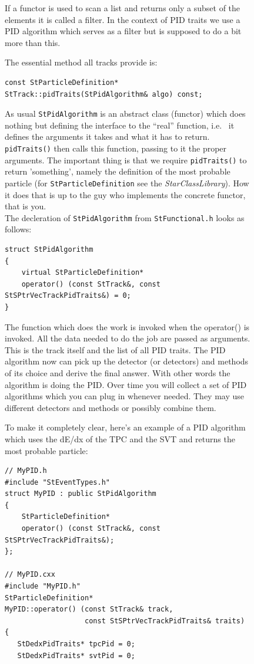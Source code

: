 \documentclass[twoside]{article}
\newcommand{\name}[1]{\textsl{#1}}%
\begin{document}
\begin{figure}[htb]
\begin{center}
If a functor is used to scan a list and returns only a subset of the
elements it is called a filter. In the context of PID traits we use a
PID algorithm which serves as a filter but is supposed to do a bit
more than this.

The essential method all tracks provide is:
\begin{verbatim}
const StParticleDefinition*
StTrack::pidTraits(StPidAlgorithm& algo) const;
\end{verbatim}

As usual \texttt{StPidAlgorithm} is an abstract class (functor) which
does nothing but defining the interface to the ``real'' function,
i.e.~ it defines the arguments it takes and what it has to return.
\texttt{pidTraits()} then calls this function, passing to it the
proper arguments. The important thing is that we require
\texttt{pidTraits()} to return 'something', namely the definition of
the most probable particle (for \texttt{StParticleDefinition} see the
\name{StarClassLibrary}). How it does that is up to the guy who
implements the concrete
functor, that is you.\\
The decleration of \texttt{StPidAlgorithm} from
\texttt{StFunctional.h} looks as follows:
\begin{verbatim}
struct StPidAlgorithm
{
    virtual StParticleDefinition*
    operator() (const StTrack&, const StSPtrVecTrackPidTraits&) = 0;
}
\end{verbatim}
 The function which does the work is
invoked when the operator() is invoked.  All the data needed to do the
job are passed as arguments.  This is the track itself and the list of
all PID traits. The PID algorithm now can pick up the detector (or
detectors) and methods of its choice and derive the final answer. With
other words the algorithm is doing the PID.  Over time you will
collect a set of PID algorithms which you can plug in whenever needed.
They may use different detectors and methods or possibly combine them.

To make it completely clear, here's an example of a PID algorithm
which uses the dE/dx of the TPC and the SVT and returns the most
probable particle:
\begin{verbatim}
// MyPID.h
#include "StEventTypes.h"
struct MyPID : public StPidAlgorithm
{
    StParticleDefinition*
    operator() (const StTrack&, const StSPtrVecTrackPidTraits&);
};

// MyPID.cxx
#include "MyPID.h"
StParticleDefinition*
MyPID::operator() (const StTrack& track,
                   const StSPtrVecTrackPidTraits& traits)
{
   StDedxPidTraits* tpcPid = 0;
   StDedxPidTraits* svtPid = 0;


\end{verbatim}
\end{center}
\end{figure}
\end{document}
